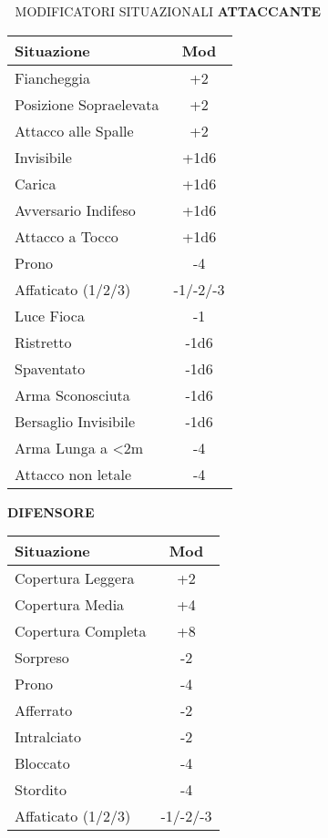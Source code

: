 \documentclass[10pt,a4paper,landscape]{article}
\begin{document}
\begin{multicols}{4}
		\begin{mainsection}{🎲 MODIFICATORI SITUAZIONALI}
			\textbf{ATTACCANTE}
			\begin{tabular}{@{}p{3.5cm}c@{}}
				\toprule
				\textbf{Situazione} & \textbf{Mod} \\
				\midrule
				Fiancheggia & +2 \\
				Posizione Sopraelevata & +2 \\
				Attacco alle Spalle & +2 \\
				Invisibile & +1d6 \\
				Carica & +1d6 \\
				Avversario Indifeso & +1d6 \\
				Attacco a Tocco & +1d6 \\
				\midrule
				Prono & -4 \\
				Affaticato (1/2/3) & -1/-2/-3 \\
				Luce Fioca & -1 \\
				Ristretto & -1d6 \\
				Spaventato & -1d6 \\
				Arma Sconosciuta & -1d6 \\
				Bersaglio Invisibile & -1d6 \\
				Arma Lunga a <2m & -4 \\
				Attacco non letale & -4 \\
				\bottomrule
			\end{tabular}

			\vspace{2mm}

			\textbf{DIFENSORE}
			\begin{tabular}{@{}p{3.5cm}c@{}}
				\toprule
				\textbf{Situazione} & \textbf{Mod} \\
				\midrule
				Copertura Leggera & +2 \\
				Copertura Media & +4 \\
				Copertura Completa & +8 \\
				\midrule
				Sorpreso & -2 \\
				Prono & -4 \\
				Afferrato & -2 \\
				Intralciato & -2 \\
				Bloccato & -4 \\
				Stordito & -4 \\
				Affaticato (1/2/3) & -1/-2/-3 \\
				\bottomrule
			\end{tabular}
		\end{mainsection}


\end{multicols}
\end{document}
